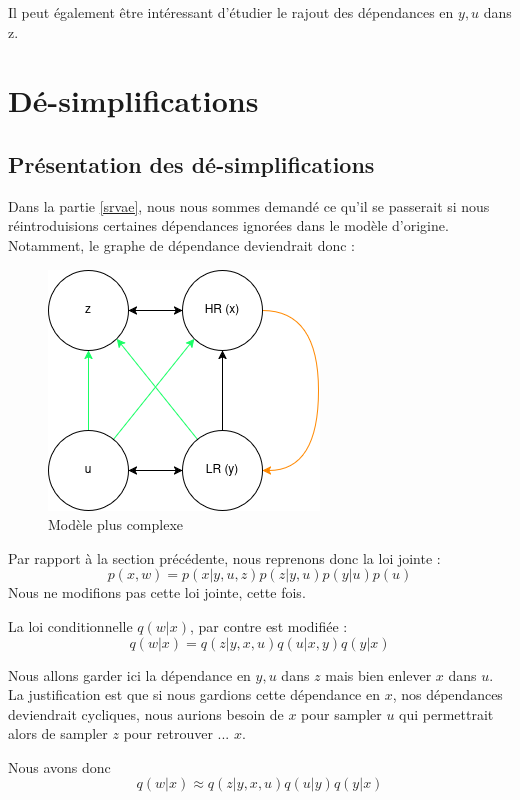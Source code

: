 \documentclass{article}
\begin{document}
Il peut également être intéressant d'étudier le rajout des dépendances en $y,u$ dans z.
\newpage
\section{Dé-simplifications}
\subsection{Présentation des dé-simplifications}

Dans la partie \ref{srvae}, nous nous sommes demandé ce qu'il se passerait si nous réintroduisions certaines dépendances ignorées dans le modèle d'origine.
Notamment, le graphe de dépendance deviendrait donc :
\begin{figure}[!ht]
    \centering
    \includegraphics[width=0.5\linewidth]{img/SRVAE_deps_all.drawio.png}
    \caption{Modèle plus complexe}
    \label{fig:depscomplexe}
\end{figure}

Par rapport à la section précédente, nous reprenons donc la loi jointe :
\begin{equation*}
    p(x,w) = p(x|y,u,z)p(z|y,u)p(y|u)p(u)
\end{equation*}
Nous ne modifions pas cette loi jointe, cette fois.

La loi conditionnelle $q(w|x)$, par contre est modifiée :
\begin{equation}
     q(w|x) = q(z|y,x,u)q(u|x,y)q(y|x)
\end{equation}

Nous allons garder ici la dépendance en $y,u$ dans $z$ mais bien enlever $x$ dans $u$.
La justification est que si nous gardions cette dépendance en $x$, nos dépendances deviendrait cycliques, nous aurions besoin de $x$ pour sampler $u$ qui permettrait alors de sampler $z$ pour retrouver ... $x$. 

Nous avons donc 
\begin{equation}
     q(w|x) \approx q(z|y,x,u)q(u|y)q(y|x)
\end{equation}
\end{document}
